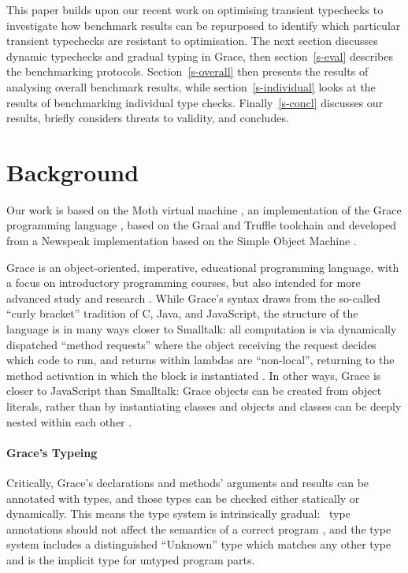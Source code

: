 \documentclass[sigplan,10pt,review,screen]{acmart}\settopmatter{printfolios=true}
\begin{document}
This paper builds upon our recent work on optimising transient
typechecks \cite{Roberts2017,roberts-and-co-ecoop-2019} to
investigate how benchmark results can be repurposed to identify which
particular transient typechecks are resistant to optimisation.
The next section discusses dynamic typechecks and gradual typing in
Grace, then section~\ref{s-eval} describes the benchmarking
protocols. Section~\ref{s-overall} then presents the results of
analysing overall benchmark results, while section~\ref{s-individual}
looks at the results of benchmarking individual type checks.
Finally~\ref{s-concl} discusses our results, briefly considers threats
to validity, and concludes.

\section{Background}
\label{s-bg}

Our work is based on the Moth virtual machine 
\cite{Roberts2017,roberts-and-co-ecoop-2019},
an implementation
of the Grace programming language 
\citep{graceOnward12,graceSigcse13},
based on the Graal and Truffle toolchain
\cite{Wurthinger:2017:PPE,Wurthinger2013}
and developed from a Newspeak implementation based on the  Simple
Object Machine \cite{Daloze2016,SOMns}.

Grace is an object-oriented, imperative, educational programming
language, with a focus on introductory programming
courses, but also intended for more advanced study and research \citep{graceOnward12,graceSigcse13}.
%
While Grace's syntax draws
from the so-called ``curly bracket'' tradition of C, Java, and
JavaScript, the structure of the language
is in many ways closer to Smalltalk:
all computation is via dynamically dispatched  ``method requests''
where the object receiving the request decides which code to run,
and
%
returns within lambdas are ``non-local'', returning to the method
activation in which the block is instantiated \citep{bluebook}.  In
other ways, Grace is closer to JavaScript than Smalltalk: Grace
objects can be created from object literals, rather than by
instantiating classes \citep{Black2007-emeraldHOPL,JonesECOOP2016} and
objects and classes can be deeply nested within each 
other \citep{betabook}.

\paragraph{Grace's Typeing}
Critically, Grace's declarations and methods' arguments
and results can be annotated with types, and those types can be  checked
either statically or dynamically. This means the type system is
intrinsically gradual:%
%
~type annotations should not affect the semantics of a correct
program \citep{XXXSiek2015}, and the type system
includes a distinguished ``{Unknown}'' type which matches any other type
and is the implicit type for untyped program parts.
\end{document}
